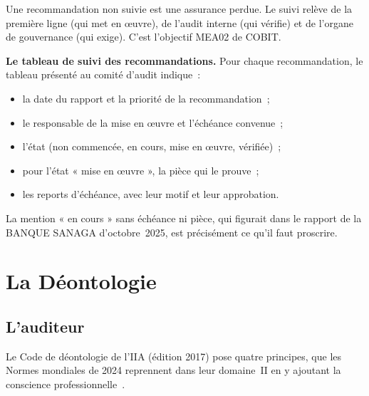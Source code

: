 Une recommandation non suivie est une assurance perdue. Le suivi relève de
la première ligne (qui met en œuvre), de l'audit interne (qui vérifie) et
de l'organe de gouvernance (qui exige). C'est l'objectif MEA02 de COBIT.

\begin{boxprocedure}
\textbf{Le tableau de suivi des recommandations.} Pour chaque
recommandation, le tableau présenté au comité d'audit indique~:
\begin{itemize}
    \item la date du rapport et la priorité de la recommandation~;
    \item le responsable de la mise en œuvre et l'échéance convenue~;
    \item l'état (non commencée, en cours, mise en œuvre, vérifiée)~;
    \item pour l'état « mise en œuvre », la pièce qui le prouve~;
    \item les reports d'échéance, avec leur motif et leur approbation.
\end{itemize}
La mention « en cours » sans échéance ni pièce, qui figurait dans le
rapport de la BANQUE SANAGA d'octobre~2025, est précisément ce qu'il faut
proscrire.
\end{boxprocedure}

\section{La Déontologie}
\label{sec:c11-deontologie}

\subsection{L'auditeur}

Le Code de déontologie de l'IIA (édition 2017) pose quatre principes, que
les Normes mondiales de 2024 reprennent dans leur domaine~II en y ajoutant
la conscience professionnelle~\cite{iia2017cripp}.

